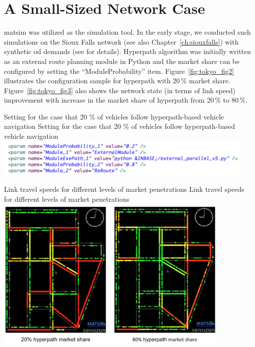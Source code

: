 \section{A Small-Sized Network Case}

\gls{matsim} was utilized as the simulation tool. In the early stage, we conducted such simulations on the Sioux Falls network (see also Chapter~\ref{ch:siouxfalls}) with synthetic \gls{od} demands (see \citep{Yamada2013} for details). Hyperpath algorithm was initially written as an external route planning module in Python and the market share can be configured by setting the ``ModuleProbability'' item. Figure~\ref{fig:tokyo_fig2} illustrates the configuration sample for hyperpath with 20\,\% market share. Figure~\ref{fig:tokyo_fig3} also shows the network state (in terms of link speed) improvement with increase in the market share of hyperpath from 20\,\% to 80\,\%.

\createfigure%
{Setting for the case that 20 \% of vehicles follow hyperpath-based vehicle navigation}%
{Setting for the case that 20 \% of vehicles follow hyperpath-based vehicle navigation}%
{\label{fig:tokyo_fig2}}%
{\includegraphics[width=0.95\textwidth, angle=0]{./scenarios/figures/tokyo_fig2.png}}%
{}

\createfigure%
{Link travel speeds for different levels of market penetrations}%
{Link travel speeds for different levels of market penetrations}%
{\label{fig:tokyo_fig3}}%
{\includegraphics[width=0.85\textwidth, angle=0]{./scenarios/figures/tokyo_fig3.png}}%
{}


